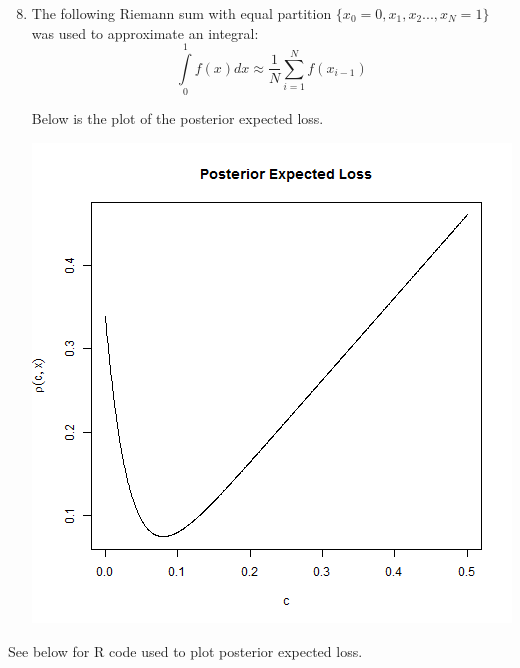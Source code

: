 \documentclass{article}
\begin{document}
\begin{enumerate}
\setcounter{enumi}{7}
\item The following Riemann sum with equal partition $\{x_0=0, x_1, x_2..., x_N=1\}$ was used to approximate an integral:
$$ \int\limits_{0}^{1} f(x)dx \approx \frac{1}{N} \sum\limits_{i=1}^{N} f(x_{i-1}) $$

Below is the plot of the posterior expected loss.
\begin{center}
\includegraphics[scale=0.4]{pel.png}
\end{center}
\end{enumerate}

\pagebreak

See below for R code used to plot posterior expected loss.

\end{document}
